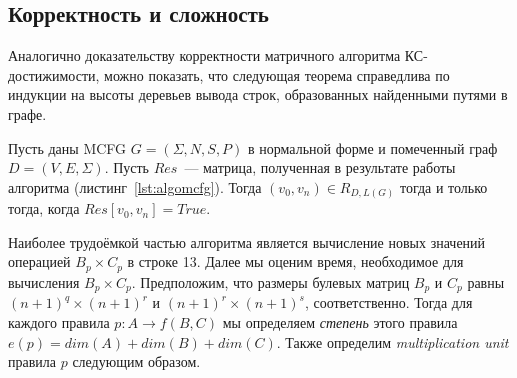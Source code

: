 





\subsection{Корректность и сложность}
Аналогично доказательству корректности матричного алгоритма КС-достижимости, можно показать, что следующая теорема справедлива по индукции на высоты деревьев вывода строк, образованных найденными путями в графе.

\begin{theorem}\label{thm:correctness}
	Пусть даны MCFG $G = (\Sigma, N, S, P)$ в нормальной форме и помеченный граф $D =(V, E, \Sigma)$. Пусть $Res$~--- матрица, полученная в результате работы алгоритма (листинг~\ref{lst:algomcfg}). Тогда $(v_0, v_n) \in R_{D,L(G)}$ тогда и только тогда, когда $Res[v_0,v_n] = True$.
\end{theorem}

Наиболее трудоёмкой частью алгоритма является вычисление новых значений операцией $B_p \times C_p$ в строке 13. Далее мы оценим время, необходимое для вычисления $B_p \times C_p$. Предположим, что размеры булевых матриц $B_p$ и $C_p$ равны $(n+1)^q \times (n+1)^r$ и $(n+1)^r \times (n+1)^s$, соответственно. Тогда для каждого правила $p: A \rightarrow f(B,C)$ мы определяем \textit{степень} этого правила $e(p) = dim(A) + dim(B) + dim(C)$. Также определим \textit{multiplication unit} правила $p$ следующим образом.

